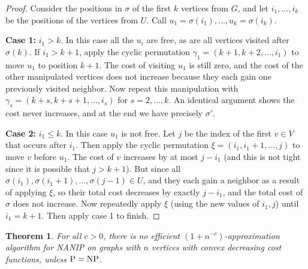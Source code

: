 \documentclass[english]{llncs}
\newtheorem{thm}{Theorem}
\begin{document}
\begin{proof}
Consider the positions in $\sigma$ of the first $k$ vertices from $G$, and let
$i_1, \dots, i_k$ be the positions of the vertices from $U$. Call $u_1 =
\sigma(i_1), \dots, u_k = \sigma(i_k)$.

\textbf{Case 1:} $i_1 > k$. In this case all the $u_i$ are free, as are all
vertices visited after $\sigma(k)$. If $i_1 > k+1$, apply the cyclic permutation
$\gamma_1 = (k+1, k+2, \dots, i_1)$ to move $u_1$ to position $k+1$. The cost
of visiting $u_1$ is still zero, and the cost of the other manipulated vertices
does not increase because they each gain one previously visited neighbor. Now
repeat this manipulation with $\gamma_s = (k+s, k+s+1, \dots, i_s)$ for $s = 2,
\dots, k$. An identical argument shows the cost never increases, and at the end
we have precisely $\sigma'$. 

\textbf{Case 2:} $i_1 \leq k$. In this case $u_1$ is not free. Let $j$ be the
index of the first $v \in V$ that occurs after $i_1$. Then apply the
cyclic permutation $\xi = (i_1, i_1 + 1, \dots, j)$ to move $v$ before $u_1$.
The cost of $v$ increases by at most $j - i_1$ (and this is not tight since it
is possible that $j > k+1$). But since all $\sigma(i_1), \sigma(i_1 + 1), \dots,
\sigma(j-1) \in U$, and they each gain a neighbor as a result of applying
$\xi$, so their total cost decreases by exactly $j - i_1$, and the total cost
of $\sigma$ does not increase. Now repeatedly apply $\xi$ (using the new values
of $i_1, j$) until $i_1 = k+1$. Then apply case 1 to finish.

\end{proof}


\begin{thm}
For all $c>0$, there is no efficient $(1+n^{-c})$-approximation
algorithm for NANIP on graphs with $n$ vertices with convex decreasing cost
functions, unless $\textup{P} = \textup{NP}$.  
\end{thm}
\end{document}
